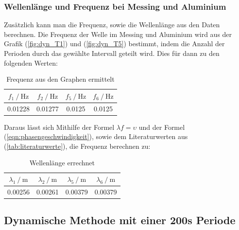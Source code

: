 \noindent
\newpage
\subsubsection{Wellenlänge und Frequenz bei Messing und Aluminium}
    Zusätzlich kann man die Frequenz, sowie die Wellenlänge aus den Daten berechnen. Die Frequenz der Welle im Messing und Aluminium wird aus der Grafik (\ref{fig:dyn_T1}) und (\ref{fig:dyn_T5}) bestimmt, indem die Anzahl der Perioden durch das gewählte Intervall geteilt wird.
    Dies für dann zu den folgenden Werten:
    \begin{table}
        \centering
            \begin{tabular}{c c c c}
            \toprule
            {$   f_1 \mathbin{/}\si{\hertz} $}
            & {$ f_2 \mathbin{/} \si{\hertz} $}
            & {$ f_5 \mathbin{/} \si{\hertz} $}
            & {$ f_6 \mathbin{/} \si{\hertz} $} \\
            \midrule
            0.01228 & 0.01277 & 0.0125 & 0.0125\\
            \bottomrule
            \end{tabular}
        \caption{Frequenz aus den Graphen ermittelt}
        \label{tab:MesWelle}
    \end{table}

\noindent  
    Daraus lässt sich Mithilfe der Formel $\lambda f = \upsilon$ und der Formel (\ref{eqn:phasengeschwindigkeit}), sowie dem Literaturwerten aus (\ref{tab:literaturwerte}), die Frequenz berechnen zu:
\begin{table}
        \centering
            \begin{tabular}{c c c c}
            \toprule
            {$   \lambda_1 \mathbin{/} \si{\meter} $}
            & {$ \lambda_2 \mathbin{/} \si{\meter} $}
            & {$ \lambda_5 \mathbin{/} \si{\meter} $}
            & {$ \lambda_6 \mathbin{/} \si{\meter} $} \\
            \midrule
            0.00256 & 0.00261 & 0.00379 & 0.00379\\
            \bottomrule
            \end{tabular}
        \caption{Wellenlänge errechnet}
        \label{tab:MesWelle}
    \end{table}


    \subsection{Dynamische Methode mit einer 200s Periode}
    
